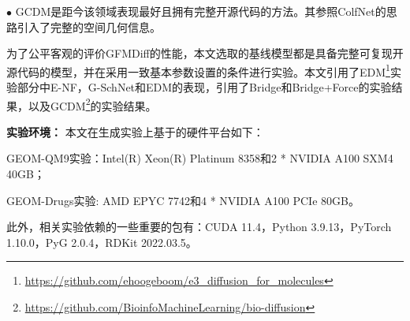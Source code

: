 $\bullet$ GCDM\cite{gcdm_morehead_23}是距今该领域表现最好且拥有完整开源代码的方法。其参照ColfNet的思路\cite{colfnet_du_22}引入了完整的空间几何信息。

为了公平客观的评价GFMDiff的性能，本文选取的基线模型都是具备完整可复现开源代码的模型，并在采用一致基本参数设置的条件进行实验。本文引用了EDM\footnote{\url{https://github.com/ehoogeboom/e3_diffusion_for_molecules}}实验部分中E-NF，G-SchNet和EDM的表现，引用了Bridge和Bridge+Force的实验结果，以及GCDM\footnote{\url{https://github.com/BioinfoMachineLearning/bio-diffusion}}的实验结果。

\textbf{实验环境：}
本文在生成实验上基于的硬件平台如下：

GEOM-QM9实验：Intel(R) Xeon(R) Platinum 8358和2 * NVIDIA A100 SXM4 40GB； 

GEOM-Drugs实验: AMD EPYC 7742和4 * NVIDIA A100 PCIe 80GB。

此外，相关实验依赖的一些重要的包有：CUDA 11.4，Python 3.9.13，PyTorch 1.10.0，PyG 2.0.4，RDKit 2022.03.5。

